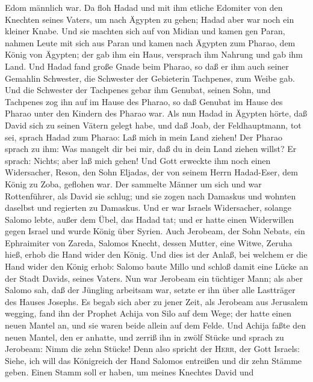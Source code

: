Edom männlich war.  Da floh Hadad und mit ihm etliche
Edomiter von den Knechten seines Vaters, um nach Ägypten zu gehen; Hadad
aber war noch ein kleiner Knabe.  Und sie machten sich
auf von Midian und kamen gen Paran, nahmen Leute mit sich aus Paran und
kamen nach Ägypten zum Pharao, dem König von Ägypten; der gab ihm ein
Haus, versprach ihm Nahrung und gab ihm Land.  Und Hadad
fand große Gnade beim Pharao, so daß er ihm auch seiner Gemahlin
Schwester, die Schwester der Gebieterin Tachpenes, zum Weibe gab.
 Und die Schwester der Tachpenes gebar ihm Genubat,
seinen Sohn, und Tachpenes zog ihn auf im Hause des Pharao, so daß
Genubat im Hause des Pharao unter den Kindern des Pharao war.
 Als nun Hadad in Ägypten hörte, daß David sich zu seinen
Vätern gelegt habe, und daß Joab, der Feldhauptmann, tot sei, sprach
Hadad zum Pharao: Laß mich in mein Land ziehen!  Der
Pharao sprach zu ihm: Was mangelt dir bei mir, daß du in dein Land
ziehen willst? Er sprach: Nichts; aber laß mich gehen! 
Und Gott erweckte ihm noch einen Widersacher, Reson, den Sohn Eljadas,
der von seinem Herrn Hadad-Eser, dem König zu Zoba, geflohen war.
 Der sammelte Männer um sich und war Rottenführer, als
David sie schlug; und sie zogen nach Damaskus und wohnten daselbst und
regierten zu Damaskus.  Und er war Israels Widersacher,
solange Salomo lebte, außer dem Übel, das Hadad tat; und er hatte einen
Widerwillen gegen Israel und wurde König über Syrien. 
Auch Jerobeam, der Sohn Nebats, ein Ephraimiter von Zareda, Salomos
Knecht, dessen Mutter, eine Witwe, Zeruha hieß, erhob die Hand wider den
König.  Und dies ist der Anlaß, bei welchem er die Hand
wider den König erhob: Salomo baute Millo und schloß damit eine Lücke an
der Stadt Davids, seines Vaters.  Nun war Jerobeam ein
tüchtiger Mann; als aber Salomo sah, daß der Jüngling arbeitsam war,
setzte er ihn über alle Lastträger des Hauses Josephs. 
Es begab sich aber zu jener Zeit, als Jerobeam aus Jerusalem wegging,
fand ihn der Prophet Achija von Silo auf dem Wege; der hatte einen neuen
Mantel an, und sie waren beide allein auf dem Felde.  Und
Achija faßte den neuen Mantel, den er anhatte, und zerriß ihn in zwölf
Stücke  und sprach zu Jerobeam: Nimm die zehn Stücke!
Denn also spricht der \textsc{Herr}, der Gott Israels: Siehe, ich will
das Königreich der Hand Salomos entreißen und dir zehn Stämme geben.
 Einen Stamm soll er haben, um meines Knechtes David und
